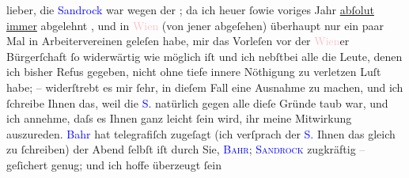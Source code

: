 \pstart
           lieber, die \textcolor{blue}{Sandrock}{}\ledrightnote{\textcolor{blue}{Adele Sandrock}} war
               wegen der \label{K_L02995-1v}\label{K_L02995-1h}{ }\label{K_L02995-2v}\label{K_L02995-2h}; da ich heuer
               ſowie voriges Jahr{ }\uline{abſolut immer} abgelehnt , und in \textcolor{pink}{Wien}{}\ledrightnote{\textcolor{pink}{Wien}} (von jener \label{K_L02995-3v}\label{K_L02995-3h} abgeſehen) überhaupt nur ein paar Mal in Arbeitervereinen geleſen habe, mir
               das Vorleſen vor der \textcolor{pink}{Wien}{}\ledrightnote{\textcolor{pink}{Wien}}er Bürgerſchaft ſo
               widerwärtig wie möglich iſt und ich nebſtbei {\pb}alle die Leute, denen ich bisher Refus gegeben, nicht\strikeout{,} ohne tiefe innere Nöthigung zu verletzen Luſt habe; – widerſtrebt es mir
               ſehr, in dieſem Fall eine Ausnahme zu machen, und ich ſchreibe Ihnen das, weil die
                  \textsc{\textcolor{blue}{S.}{}\ledrightnote{\textcolor{blue}{Adele Sandrock}}} natürlich gegen alle dieſe Gründe taub war, und ich annehme, daſs es Ihnen ganz
               leicht ſein wird, ihr meine Mitwirkung auszureden. \textcolor{blue}{Bahr}{}\ledrightnote{\textcolor{blue}{Hermann Bahr}} hat tele{\pb}grafiſch zugeſagt (ich
               verſprach der \textsc{\textcolor{blue}{S.}{}\ledrightnote{\textcolor{blue}{Adele Sandrock}}} Ihnen das gleich zu ſchreiben) der Abend ſelbſt iſt durch Sie, \textsc{\textcolor{blue}{Bahr}{}\ledrightnote{\textcolor{blue}{Hermann Bahr}}}; \textsc{\textcolor{blue}{Sandrock}{}\ledrightnote{\textcolor{blue}{Adele Sandrock}}} zugkräftig \textcolor{gray}{–} geſichert genug; und ich hoffe überzeugt ſein
